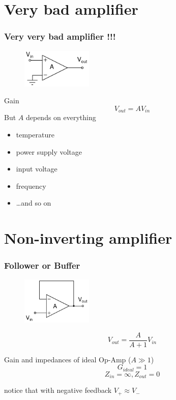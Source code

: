 \documentclass[beamer]{standalone}
\begin{document}
\section{Very bad amplifier}
\begin{frame}
\frametitle{Very very bad amplifier !!!}
\begin{figure}
	\includegraphics[width=0.30\textwidth]{./schematics/very_bad_amplifier.pdf}
\end{figure}

\begin{block}{Gain}
\begin{equation*}
	V_{out}=A V_{in}
\end{equation*}
But $A$ depends on everything
\begin{itemize}
	\item temperature
	\item power supply voltage
	\item input voltage
	\item frequency
	\item \dots and so on
\end{itemize}
\end{block}
\end{frame}

\section{Non-inverting amplifier}
\begin{frame}
\frametitle{Follower or Buffer}
\begin{figure}
	\includegraphics[width=0.30\textwidth]{./schematics/buffer.pdf}
\end{figure}
\begin{equation*}
	V_{out}=\frac{A}{A+1} V_{in}
\end{equation*}
\begin{block}{Gain  and impedances of ideal Op-Amp ($A \gg 1$)}
\begin{equation*}
	G_{ideal}=1
\end{equation*}
\begin{equation*}
	Z_{in}=\infty, Z_{out}=0
\end{equation*}
\end{block}
\alert{notice that with negative feedback $V_{+} \approx V_-$}
\end{frame}
\end{document}
